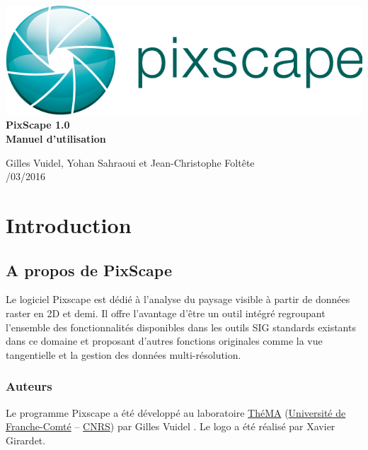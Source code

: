 \documentclass{report}
\begin{document}
 \begin{titlepage}
	
	\centering
	\includegraphics[scale=0.5]{img/logo.png}\\
	
	\bigskip
	\bigskip
	\bigskip	
	{\Huge
		\bfseries
		PixScape 1.0\\
		\bigskip
		Manuel d’utilisation\\
	}
	\bigskip
	\bigskip
	\bigskip
	\bigskip
	\bigskip
	
	{\Large		
		Gilles Vuidel, Yohan Sahraoui et Jean-Christophe Foltête\\
		/03/2016\\
	}
	
\end{titlepage}

\setcounter{tocdepth}{2}
\tableofcontents

\pagebreak

\chapter{Introduction}

\section{A propos de PixScape}

Le logiciel Pixscape est dédié à l'analyse du paysage visible à partir de données raster en 2D et demi. Il offre l’avantage d’être un outil intégré regroupant l’ensemble des fonctionnalités disponibles dans les outils SIG standards existants dans ce domaine et proposant d’autres fonctions originales comme la vue tangentielle et la gestion des données multi-résolution.


\subsection{Auteurs}
Le programme Pixscape a été développé au laboratoire \href{http://thema.univ-fcomte.fr}{ThéMA} (\href{http://www.univ-fcomte.fr}{Université de Franche-Comté} – \href{http://www.cnrs.fr}{CNRS}) par Gilles Vuidel . Le logo a été réalisé par Xavier Girardet.
\end{document}
